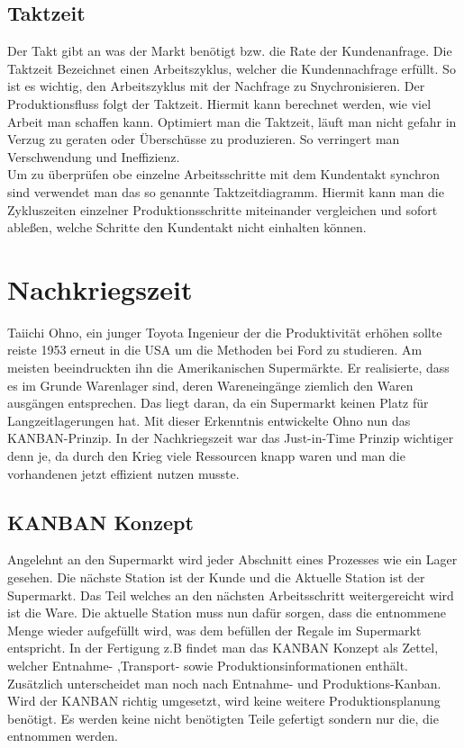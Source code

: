 \documentclass[00_ToyotaProduktionssystem.tex]{subfiles}
\begin{document}
\subsection{Taktzeit}
Der Takt gibt an was der Markt benötigt bzw. die Rate der Kundenanfrage. Die Taktzeit Bezeichnet einen Arbeitszyklus, welcher die Kundennachfrage erfüllt. So ist es wichtig, den Arbeitszyklus mit der Nachfrage zu Snychronisieren. Der Produktionsfluss folgt der Taktzeit. Hiermit kann berechnet werden, wie viel Arbeit man schaffen kann. Optimiert man die Taktzeit, läuft man nicht gefahr in Verzug zu geraten oder Überschüsse zu produzieren. So verringert man Verschwendung und Ineffizienz.
\\
Um zu überprüfen obe einzelne Arbeitsschritte mit dem Kundentakt synchron sind verwendet man das so genannte Taktzeitdiagramm. Hiermit kann man die Zykluszeiten einzelner Produktionsschritte miteinander vergleichen und sofort ableßen, welche Schritte den Kundentakt nicht einhalten können.


\section{Nachkriegszeit}
Taiichi Ohno, ein junger Toyota Ingenieur der die Produktivität erhöhen sollte reiste 1953 erneut in die USA um die Methoden bei Ford zu studieren. Am meisten beeindruckten ihn die Amerikanischen Supermärkte. Er realisierte, dass es im Grunde Warenlager sind, deren Wareneingänge ziemlich den Waren ausgängen entsprechen. Das liegt daran, da ein Supermarkt keinen Platz für Langzeitlagerungen hat. Mit dieser Erkenntnis entwickelte Ohno nun das KANBAN-Prinzip. In der Nachkriegszeit war das Just-in-Time Prinzip wichtiger denn je, da durch den Krieg viele Ressourcen knapp waren und man die vorhandenen jetzt effizient nutzen musste.
\subsection{KANBAN Konzept}
Angelehnt an den Supermarkt wird jeder Abschnitt eines Prozesses wie ein Lager gesehen. Die nächste Station ist der Kunde und die Aktuelle Station ist der Supermarkt. Das Teil welches an den nächsten Arbeitsschritt weitergereicht wird ist die Ware. Die aktuelle Station muss nun dafür sorgen, dass die entnommene Menge wieder aufgefüllt wird, was dem befüllen der Regale im Supermarkt entspricht.
In der Fertigung z.B findet man das KANBAN Konzept als Zettel, welcher Entnahme- ,Transport- sowie Produktionsinformationen enthält.
Zusätzlich unterscheidet man noch nach Entnahme- und Produktions-Kanban.
Wird der KANBAN richtig umgesetzt, wird keine weitere Produktionsplanung benötigt. Es werden keine nicht benötigten Teile gefertigt sondern nur die, die entnommen werden.
\end{document}

